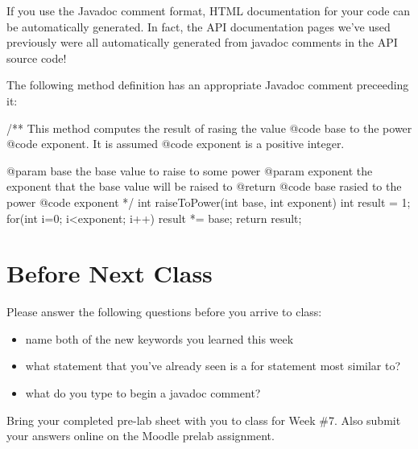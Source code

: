 If you use the Javadoc comment format, HTML documentation for your code can be automatically generated. In fact, the API documentation pages we've used previously were all automatically generated from javadoc comments in the API source code!

\newpage

\begin{exa}
The following method definition has an appropriate Javadoc comment preceeding it:

\begin{code}
/** This method computes the result of rasing the value {@code base} to the power {@code exponent}.
    It is assumed {@code exponent} is a positive integer.
    
    @param base the base value to raise to some power
    @param exponent the exponent that the base value will be raised to
    @return {@code base} rasied to the power {@code exponent}
*/
int raiseToPower(int base, int exponent) {
  int result = 1;
  for(int i=0; i<exponent; i++) { 
    result *= base;
  } 
  return result;
}
\end{code}
\end{exa}

\section{Before Next Class}

Please answer the following questions before you arrive to class:

\begin{exer}

\begin{itemize}

\item name both of the new keywords you learned this week

  \evalline
  
\item what statement that you've already seen is a for statement most similar to?

  \evalline
  
\item what do you type to begin a javadoc comment?

  \evalline
  
\end{itemize}

\end{exer}

Bring your completed pre-lab sheet with you to class for Week \#7. Also submit your answers online on the Moodle prelab assignment.  

